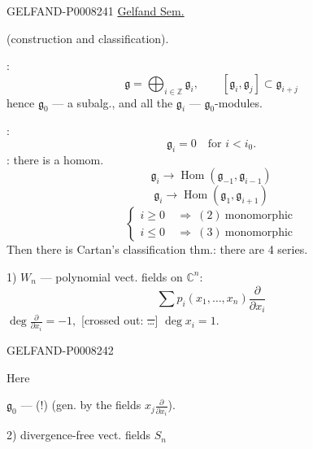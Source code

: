 \begin{GelfandAdjacentEvidence}{GELFAND-P000824}{1}
 \qquad \uline{Gelfand Sem.}



(construction and classification).

:
\[
\mathfrak g=\bigoplus_{i\in\mathbb{Z}}\mathfrak g_i,\qquad
[\mathfrak g_i,\mathfrak g_j]\subset\mathfrak g_{i+j}
\]
hence \(\mathfrak g_0\) — a subalg., and all the \(\mathfrak g_i\) —
\(\mathfrak g_0\)-modules.

:
\begin{equation*}
\mathfrak g_i=0\quad\text{for }i<i_0.\tag{1}
\end{equation*}
: there is a homom.
\begin{equation*}
\mathfrak g_i\to\operatorname{Hom}(\mathfrak g_{-1},\mathfrak g_{i-1})\tag{2}
\end{equation*}
\begin{equation*}
\mathfrak g_i\to\operatorname{Hom}(\mathfrak g_1,\mathfrak g_{i+1})\tag{3}
\end{equation*}
\begin{equation*}
\left\{\begin{aligned}
i\ge0&\ \Rightarrow\ (2)\ \text{monomorphic}\\
i\le0&\ \Rightarrow\ (3)\ \text{monomorphic}
\end{aligned}\right.\tag{4}
\end{equation*}
Then there is Cartan’s classification thm.: there are 4 series.

1) \(W_n\) — polynomial vect. fields on \(\mathbb{C}^n\):
\begin{equation*}
\sum p_i(x_1,\ldots,x_n)\frac{\partial}{\partial x_i}\tag{5}
\end{equation*}
\(\deg\frac{\partial}{\partial x_i}=-1,\)
[crossed out: \sout{…}]
\(\deg x_i=1.\)
\end{GelfandAdjacentEvidence}
\begin{GelfandAdjacentEvidence}{GELFAND-P000824}{2}


Here

\(\mathfrak g_0\) — (!)
(gen. by the fields \(x_j\frac{\partial}{\partial x_i}\)).

2) divergence-free vect. fields \(S_n\)
\end{GelfandAdjacentEvidence}


